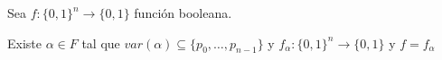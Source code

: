 %

\begin{teorema}{}{}
    Sea $f: {\{ 0, 1 \}}^n \to \{ 0, 1 \}$ función booleana.

    \medskip

    Existe $\alpha \in F$ tal que 
    $var(\alpha) \subseteq \{ p_0, \dotsc, p_{n-1} \}$
    y
    $f_{\alpha} : {\{ 0, 1 \}}^n \to \{ 0, 1 \}$
    y
    $f = f_{\alpha}$
\end{teorema}


